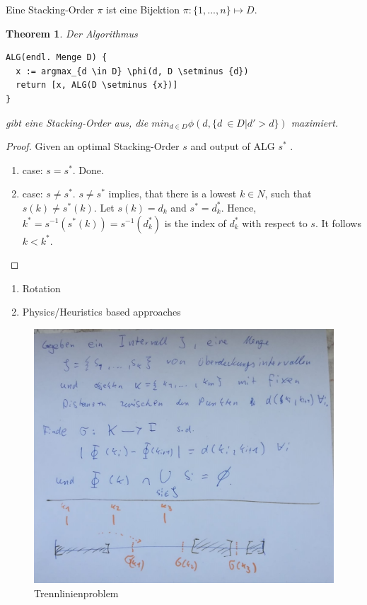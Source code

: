 \documentclass[a4paper,11pt]{article}
\newtheorem{theorem}{Theorem}
\begin{document}
Eine Stacking-Order $\pi$ ist eine Bijektion $\pi: \{1,...,n\} \mapsto D$.

\begin{theorem}
  
Der Algorithmus 

\begin{verbatim}
ALG(endl. Menge D) {
  x := argmax_{d \in D} \phi(d, D \setminus {d})
  return [x, ALG(D \setminus {x})]
}
\end{verbatim}

gibt eine Stacking-Order aus, die $min_{d \in D} \phi(d, \{d\ \in D | d' > d\})$ maximiert.
\end{theorem}

\begin{proof}
  Given an optimal Stacking-Order $s$ and output of ALG $s^*$ .

  \begin{enumerate}
    \item case: $s=s^*$. Done.
    \item case: $s \neq s^*$. $s \neq s^*$ implies, that there is a lowest $k \in N$, such that $s(k) \neq s^*(k)$. Let $s(k) = d_k$ and $s^* = d^*_k$. Hence, $k^* = s^{-1}(s^*(k)) = s^{-1}(d^*_k)$ is the index of $d^*_k$ with respect to $s$. It follows $k<k^*$.
  \end{enumerate}
\end{proof}

\begin{enumerate}
  \item Rotation
  \item Physics/Heuristics based approaches
\end{enumerate}

\begin{figure}[htp]
  \includegraphics[width=\textwidth,height=\textheight,keepaspectratio]{assets/trennlinienproblem.jpg}
  \caption{Trennlinienproblem}
\end{figure}
\end{document}

